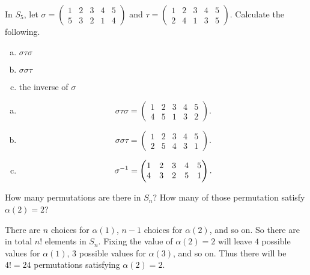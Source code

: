 \begin{problem}
	In $ S_5 $, let $ \sigma = \begin{pmatrix} 1 & 2 & 3 & 4 & 5 \\ 5 & 3 & 2 & 1 & 4 \end{pmatrix} $ and $ \tau = \begin{pmatrix} 1 & 2 & 3 & 4 & 5 \\ 2 & 4 & 1 & 3 & 5\end{pmatrix} $. Calculate the following.
	\begin{enumerate}[(a)]
		\item $ \sigma\tau\sigma $
		\item $ \sigma\sigma\tau $
		\item the inverse of $ \sigma $
	\end{enumerate}
\end{problem}

\begin{solution}
	\begin{enumerate}[(a)]
		\item 
		\[ \sigma\tau\sigma = \begin{pmatrix} 1 & 2 & 3 & 4 & 5 \\ 4 & 5 & 1 & 3 & 2 \end{pmatrix}. \]
		\item 
		\[ \sigma \sigma \tau = \begin{pmatrix} 1 & 2 & 3 & 4 & 5 \\ 2 & 5 & 4 & 3 & 1 \end{pmatrix}. \]
		\item 
		\[ \sigma^{-1} = \begin{pmatrix} 1 & 2 & 3 & 4 & 5 \\ 4 & 3 & 2 & 5 & 1 \end{pmatrix}. \]
	\end{enumerate}
\end{solution}

\begin{problem}
	How many permutations are there in $ S_n $? How many of those permutation satisfy $ \alpha(2) = 2 $?
\end{problem}
\begin{solution}
	There are $ n $ choices for $ \alpha(1) $, $ n-1 $ choices for $ \alpha(2) $, and so on. So there are in total $ n! $ elements in $ S_n $. Fixing the value of $ \alpha(2) = 2 $ will leave $ 4 $ possible values for $ \alpha(1) $, 3 possible values for $ \alpha(3) $, and so on. Thus there will be $ 4! = 24 $ permutations satisfying $ \alpha(2) = 2 $.
\end{solution}

